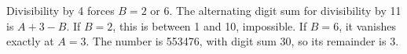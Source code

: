 Divisibility by 4 forces $B=2$ or 6. The alternating digit sum for divisibility by 11 is $A+3-B$. If $B=2$, this is between 1 and 10, impossible. If $B=6$, it vanishes exactly at $A=3$. The number is 553476, with digit sum 30, so its remainder is $\boxed3$.
